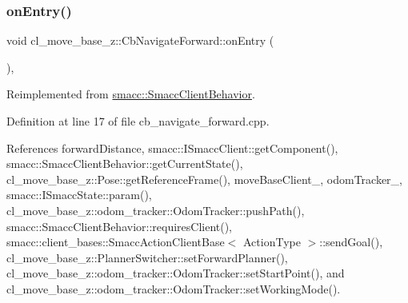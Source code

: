 \subsubsection{\texorpdfstring{on\+Entry()}{onEntry()}}
{\footnotesize\ttfamily void cl\+\_\+move\+\_\+base\+\_\+z\+::\+Cb\+Navigate\+Forward\+::on\+Entry (\begin{DoxyParamCaption}{ }\end{DoxyParamCaption})\hspace{0.3cm}{\ttfamily [override]}, {\ttfamily [virtual]}}



Reimplemented from \hyperlink{classsmacc_1_1SmaccClientBehavior_a7962382f93987c720ad432fef55b123f}{smacc\+::\+Smacc\+Client\+Behavior}.



Definition at line 17 of file cb\+\_\+navigate\+\_\+forward.\+cpp.



References forward\+Distance, smacc\+::\+I\+Smacc\+Client\+::get\+Component(), smacc\+::\+Smacc\+Client\+Behavior\+::get\+Current\+State(), cl\+\_\+move\+\_\+base\+\_\+z\+::\+Pose\+::get\+Reference\+Frame(), move\+Base\+Client\+\_\+, odom\+Tracker\+\_\+, smacc\+::\+I\+Smacc\+State\+::param(), cl\+\_\+move\+\_\+base\+\_\+z\+::odom\+\_\+tracker\+::\+Odom\+Tracker\+::push\+Path(), smacc\+::\+Smacc\+Client\+Behavior\+::requires\+Client(), smacc\+::client\+\_\+bases\+::\+Smacc\+Action\+Client\+Base$<$ Action\+Type $>$\+::send\+Goal(), cl\+\_\+move\+\_\+base\+\_\+z\+::\+Planner\+Switcher\+::set\+Forward\+Planner(), cl\+\_\+move\+\_\+base\+\_\+z\+::odom\+\_\+tracker\+::\+Odom\+Tracker\+::set\+Start\+Point(), and cl\+\_\+move\+\_\+base\+\_\+z\+::odom\+\_\+tracker\+::\+Odom\+Tracker\+::set\+Working\+Mode().



